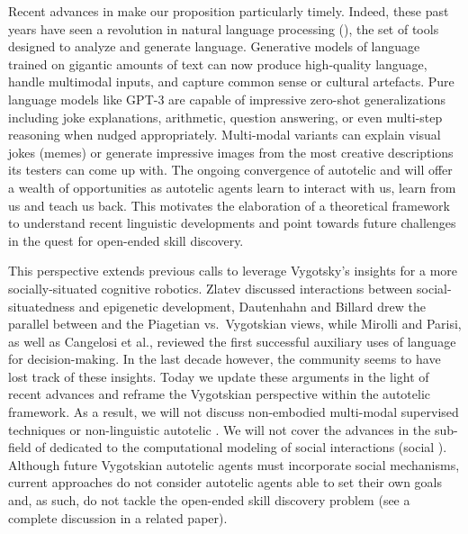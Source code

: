 Recent advances in \ai make our proposition particularly timely. Indeed, these past years have seen a revolution in natural language processing (\nlp), the set of tools designed to analyze and generate language. Generative models of language trained on gigantic amounts of text can now produce high-quality language,\cite{brown2020language} handle multimodal inputs,\cite{radford2021learning,ramesh2022hierarchical,alayrac2022flamingo} and capture common sense\cite{west_symbolic_2021} or cultural artefacts.\cite{hershcovich_challenges_2022,arora2022probing} Pure language models like GPT-3\cite{brown2020language} are capable of impressive zero-shot generalizations including joke explanations, arithmetic, question answering, or even multi-step reasoning when nudged appropriately.\cite{creswell2022selection} Multi-modal variants can explain visual jokes (memes)\cite{alayrac2022flamingo} or generate impressive images from the most creative descriptions its testers can come up with.\cite{ramesh_zero-shot_2021,ramesh2022hierarchical} The ongoing convergence of autotelic \rl and \nlp will offer a wealth of opportunities as autotelic agents learn to interact with us, learn from us and teach us back. This motivates the elaboration of a theoretical framework to understand recent linguistic \rl developments and point towards future challenges in the quest for open-ended skill discovery.

This perspective extends previous calls to leverage Vygotsky's insights for a more socially-situated cognitive robotics.\cite{dautenhahn_studying_1999, zlatev_epigenesis_2001, lindblom_social_2003,mirolli_towards_2011} Zlatev discussed interactions between social-situatedness and epigenetic development,\cite{zlatev_epigenesis_2001} Dautenhahn and Billard drew the parallel between \ai and the Piagetian vs.\, Vygotskian views,\cite{dautenhahn_studying_1999} while Mirolli and Parisi, as well as Cangelosi et al., reviewed the first successful auxiliary uses of language for decision-making.\cite{mirolli_towards_2011, cangelosi2010integration} In the last decade however, the \ai community seems to have lost track of these insights. Today we update these arguments in the light of recent \ai advances and reframe the Vygotskian perspective within the autotelic \rl framework. As a result, we will not discuss non-embodied multi-modal supervised techniques\cite{radford2021learning, ramesh2022hierarchical, alayrac2022flamingo} or non-linguistic autotelic \rl.\cite{schaul_universal_2015} We will not cover the advances in the sub-field of \rl dedicated to the computational modeling of social interactions (social \rl).\cite{jaques2019social} Although future Vygotskian autotelic agents must incorporate social \rl mechanisms, current approaches do not consider autotelic agents able to set their own goals and, as such, do not tackle the open-ended skill discovery problem (see a complete discussion in a related paper\cite{sigaud_towards_2021}).


